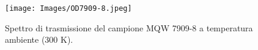 \begin{figure}[h!]
    \centering
    \texttt{[image: Images/OD7909-8.jpeg]}
    \caption{Spettro di trasmissione del campione MQW 7909-8 a temperatura ambiente (300 K).}
    \label{fig:my_label}
\end{figure}
